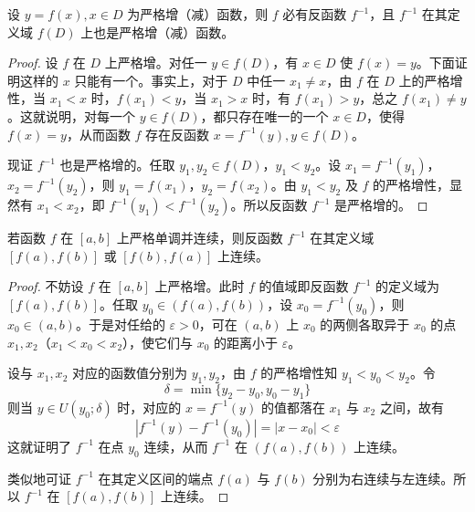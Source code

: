 \documentclass[../../main.tex]{subfiles}
\begin{document}
\begin{theorem}[反函数存在定理]\label{theorem:反函数存在定理}
设 \( y = f(x), x \in D \) 为严格增（减）函数，则 \( f \) 必有反函数 \( f^{-1} \)，且 \( f^{-1} \) 在其定义域 \( f(D) \) 上也是严格增（减）函数。
\end{theorem}
\begin{proof}
设 \( f \) 在 \( D \) 上严格增。对任一 \( y \in f(D) \)，有 \( x \in D \) 使 \( f(x) = y \)。下面证明这样的 \( x \) 只能有一个。事实上，对于 \( D \) 中任一 \( x_1 \neq x \)，由 \( f \) 在 \( D \) 上的严格增性，当 \( x_1 < x \) 时，\( f(x_1) < y \)，当 \( x_1 > x \) 时，有 \( f(x_1) > y \)，总之 \( f(x_1) \neq y \)。这就说明，对每一个 \( y \in f(D) \)，都只存在唯一的一个 \( x \in D \)，使得 \( f(x) = y \)，从而函数 \( f \) 存在反函数 \( x = f^{-1}(y), y \in f(D) \)。

现证 \( f^{-1} \) 也是严格增的。任取 \( y_1, y_2 \in f(D) \)，\( y_1 < y_2 \)。设 \( x_1 = f^{-1}(y_1) \)，\( x_2 = f^{-1}(y_2) \)，则 \( y_1 = f(x_1) \)，\( y_2 = f(x_2) \)。由 \( y_1 < y_2 \) 及 \( f \) 的严格增性，显然有 \( x_1 < x_2 \)，即 \( f^{-1}(y_1) < f^{-1}(y_2) \)。所以反函数 \( f^{-1} \) 是严格增的。
\end{proof}

\begin{theorem}[反函数连续定理]\label{theorem:反函数连续定理}
若函数 \( f \) 在 \([a, b]\) 上严格单调并连续，则反函数 \( f^{-1} \) 在其定义域 \([f(a), f(b)]\) 或 \([f(b), f(a)]\) 上连续。
\end{theorem}
\begin{proof}
不妨设 \( f \) 在 \([a, b]\) 上严格增。此时 \( f \) 的值域即反函数 \( f^{-1} \) 的定义域为 \([f(a), f(b)]\)。任取 \( y_0 \in (f(a), f(b)) \)，设 \( x_0 = f^{-1}(y_0) \)，则 \( x_0 \in (a, b) \)。于是对任给的 \( \varepsilon > 0 \)，可在 \( (a, b) \) 上 \( x_0 \) 的两侧各取异于 \( x_0 \) 的点 \( x_1, x_2 \)（\( x_1 < x_0 < x_2 \)），使它们与 \( x_0 \) 的距离小于 \( \varepsilon \)。

设与 \( x_1, x_2 \) 对应的函数值分别为 \( y_1, y_2 \)，由 \( f \) 的严格增性知 \( y_1 < y_0 < y_2 \)。令
\[
\delta = \min\{ y_2 - y_0, y_0 - y_1 \}
\]
则当 \( y \in U(y_0; \delta) \) 时，对应的 \( x = f^{-1}(y) \) 的值都落在 \( x_1 \) 与 \( x_2 \) 之间，故有
\[
| f^{-1}(y) - f^{-1}(y_0) | = | x - x_0 | < \varepsilon
\]
这就证明了 \( f^{-1} \) 在点 \( y_0 \) 连续，从而 \( f^{-1} \) 在 \( (f(a), f(b)) \) 上连续。

类似地可证 \( f^{-1} \) 在其定义区间的端点 \( f(a) \) 与 \( f(b) \) 分别为右连续与左连续。所以 \( f^{-1} \) 在 \([f(a), f(b)]\) 上连续。
\end{proof}
\end{document}
